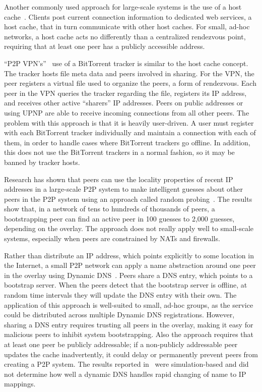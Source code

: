 \documentclass[conference]{IEEEtran}
\begin{document}
Another commonly used approach for large-scale systems is the use of a host
cache~\cite{host_cache}.  Clients post current connection information to
dedicated web services, a host cache, that in turn communicate with other host
caches.  For small, ad-hoc networks, a host cache acts no differently than a
centralized rendezvous point, requiring that at least one peer has a publicly
accessible address.

``P2P VPN's''~\cite{p2pvpn} use of a BitTorrent tracker is similar to the host
cache concept.  The tracker hosts file meta data and peers involved in sharing.
For the VPN, the peer registers a virtual file used to organize the peers, a
form of rendezvous.  Each peer in the VPN queries the tracker regarding the
file, registers its IP address, and receives other active ``sharers'' IP
addresses.  Peers on public addresses or using UPNP are able to receive
incoming connections from all other peers.  The problem with this approach is
that it is heavily user-driven.  A user must register with each BitTorrent
tracker individually and maintain a connection with each of them, in order to
handle cases where BitTorrent trackers go offline.  In addition, this does not
use the BitTorrent trackers in a normal fashion, so it may be banned by tracker
hosts.

Research has shown that peers can use the locality properties of recent IP
addresses in a large-scale P2P system to make intelligent guesses about other
peers in the P2P system using an approach called random
probing~\cite{bootstrapping_p2p, locality_aware}.  The results show that, in a
network of tens to hundreds of thousands of peers, a bootstrapping peer can
find an active peer in 100 guesses to 2,000 guesses, depending on the overlay.
The approach does not really apply well to small-scale systems, especially when
peers are constrained by NATs and firewalls.

Rather than distribute an IP address, which points explicitly to some location
in the Internet, a small P2P network can apply a name abstraction around one
peer in the overlay using Dynamic DNS~\cite{bootstrapping_ddns}.  Peers share a
DNS entry, which points to a bootstrap server.  When the peers detect that the
bootstrap server is offline, at random time intervals they will update the DNS
entry with their own.  The application of this approach is well-suited to
small, ad-hoc groups, as the service could be distributed across multiple
Dynamic DNS registrations.  However, sharing a DNS entry requires trusting all
peers in the overlay, making it easy for malicious peers to inhibit system
bootstrapping.  Also the approach requires that at least one peer be publicly
addressable; if a non-publicly addressable peer updates the cache
inadvertently, it could delay or permanently prevent peers from creating a P2P
system.  The results reported in~\cite{bootstrapping_ddns} were
simulation-based and did not determine how well a dynamic DNS handles rapid
changing of name to IP mappings.
\end{document}
